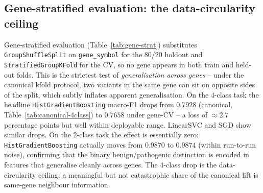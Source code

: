 \documentclass[11pt,a4paper]{article}
\begin{document}
\subsection{Gene-stratified evaluation: the data-circularity ceiling}
\label{sec:gene-strat}

Gene-stratified evaluation (Table~\ref{tab:gene-strat}) substitutes
\texttt{GroupShuffleSplit} on \texttt{gene\_symbol} for the 80/20 holdout and
\texttt{StratifiedGroupKFold} for the CV, so no gene appears in both train and
held-out folds. This is the strictest test of \emph{generalisation across genes}
-- under the canonical kfold protocol, two variants in the same gene can sit on
opposite sides of the split, which subtly inflates apparent generalisation. On
the 4-class task the headline \texttt{HistGradientBoosting} macro-F1 drops from
$0.7928$ (canonical, Table~\ref{tab:canonical-4class}) to $0.7658$ under gene-CV
-- a loss of $\approx 2.7$ percentage points but well within deployable range.
LinearSVC and SGD show similar drops. On the 2-class task the effect is
essentially zero: \texttt{HistGradientBoosting} actually moves from $0.9870$ to
$0.9874$ (within run-to-run noise), confirming that the binary
benign/pathogenic distinction is encoded in features that generalise cleanly
across genes. The 4-class drop is the data-circularity ceiling: a meaningful
but not catastrophic share of the canonical lift is same-gene neighbour
information.
\end{document}

